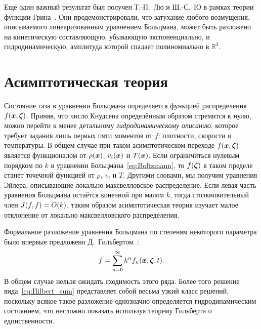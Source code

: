 Ещё один важный результат был получен Т.-П.~Лю и Ш.-С.~Ю в рамках теории функции Грина~\cite{Liu2004green,Liu2006}.
Они продемонстрировали, что затухание любого возмущения, описываемого линеаризованным уравнением Больцмана,
может быть разложено на кинетическую составляющую, убывающую экспоненциально,
и гидродинамическую, амплитуда которой спадает полиномиально в \(\mathbb{R}^3\).

\section{Асимптотическая теория} \label{sect:asymptotic}

Состояние газа в уравнении Больцмана определяется функцией распределения \(f({\boldsymbol{x}},{\boldsymbol{\zeta}})\).
Приняв, что число Кнудсена определённым образом стремится к нулю, можно перейти к менее детальному
\emph{гидродинамическому описанию}, которое требует задания лишь первых пяти моментов от \(f\):
плотности, скорости и температуры.
В общем случае при таком асимптотическом переходе \(f({\boldsymbol{x}},{\boldsymbol{\zeta}})\) является функционалом от
\(\rho({\boldsymbol{x}})\), \(v_i({\boldsymbol{x}})\) и \(T({\boldsymbol{x}})\). Если ограничиться нулевым порядком по \(k\)
в уравнении Больцмана~\eqref{eq:Boltzmann}, то \(f({\boldsymbol{\zeta}})\) в таком пределе станет точечной
функцией от \(\rho\), \(v_i\) и \(T\). Другими словами, мы получим уравнения Эйлера,
описывающие локально максвелловское распределение.
Если левая часть уравнения Больцмана остаётся конечной при малом \(k\),
тогда столкновительный член \(J(f,f) = O(k)\), таким образом асимптотическая теория
изучает малое отклонение от локально максвелловского распределения.

Формальное разложение уравнения Больцмана по степеням некоторого параметра было впервые
предложено Д.~Гильбертом~\cite{Hilbert1912, Hilbert1924}:
\begin{equation}\label{eq:Hilbert_sum}
    f = \sum_{n=0}^\infty k^n f_n({\boldsymbol{x}},{\boldsymbol{\zeta}},t).
\end{equation}
В общем случае нельзя ожидать сходимость этого ряда.
Более того решение вида~\eqref{eq:Hilbert_sum} представляет собой весьма узкий класс решений,
поскольку всякое такое разложение однозначно определяется гидродинамическим состоянием,
что несложно показать используя теорему Гильберта о единственности.

